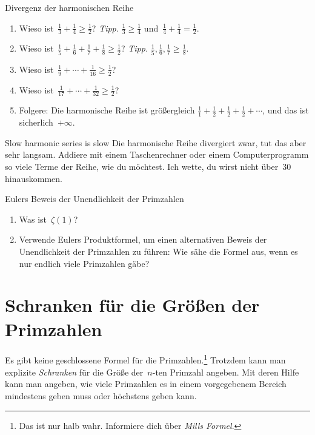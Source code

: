 \documentclass[twoside]{../zirkelblatt1415}
\theoremstyle{definition}
\theoremstyle{plain}
\theoremstyle{remark}
\begin{document}
\begin{aufgabe}{Divergenz der harmonischen Reihe}
\begin{enumerate}
\item Wieso ist~$\frac{1}{3} + \frac{1}{4} \geq \frac{1}{2}$?
\tabto{6cm}
\emph{Tipp.} $\frac{1}{3} \geq \frac{1}{4}$ und~$\frac{1}{4} + \frac{1}{4} =
\frac{1}{2}$.
\item Wieso ist~$\frac{1}{5} + \frac{1}{6} + \frac{1}{7} + \frac{1}{8} \geq \frac{1}{2}$?
\tabto{6cm}
\emph{Tipp.} $\frac{1}{5}, \frac{1}{6}, \frac{1}{7} \geq \frac{1}{8}$.

\item Wieso ist~$\frac{1}{9} + \cdots + \frac{1}{16} \geq \frac{1}{2}$?

\item Wieso ist~$\frac{1}{17} + \cdots + \frac{1}{32} \geq \frac{1}{2}$?

\item Folgere: Die harmonische Reihe ist größergleich
$\frac{1}{1} + \frac{1}{2} + \frac{1}{2} + \frac{1}{2} + \cdots$,
und das ist sicherlich~$+\infty$.
\end{enumerate}\fixlistspacing
\end{aufgabe}

\begin{aufgabe}{Slow harmonic series is slow}
Die harmonische Reihe divergiert zwar, tut das aber sehr langsam. Addiere mit
einem Taschenrechner oder einem Computerprogramm so viele Terme der Reihe, wie
du möchtest. Ich wette, du wirst nicht über~$30$ hinauskommen.
\end{aufgabe}

\begin{aufgabe}{Eulers Beweis der Unendlichkeit der Primzahlen}
\begin{enumerate}
\item Was ist~$\zeta(1)$?
\item Verwende Eulers Produktformel, um einen alternativen Beweis der
Unendlichkeit der Primzahlen zu führen: Wie sähe die Formel aus, wenn es nur
endlich viele Primzahlen gäbe?
\end{enumerate}\fixlistspacing
\end{aufgabe}


\section{Schranken für die Größen der Primzahlen}

Es gibt keine geschlossene Formel für die Primzahlen.\footnote{Das ist nur halb
wahr. Informiere dich über \emph{Mills Formel}.} Trotzdem kann man explizite
\emph{Schranken} für die Größe der~$n$-ten Primzahl angeben. Mit deren Hilfe
kann man angeben, wie viele Primzahlen es in einem vorgegebenem Bereich
mindestens geben muss oder höchstens geben kann.
\end{document}
